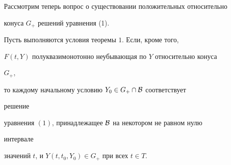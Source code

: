 


Рассмотрим теперь вопрос о существовании положительных относительно 


конуса $G_+$ решений уравнения (1). 


 


\begin{thm} 


Пусть выполняются условия теоремы $1$. Если, кроме того, 


$F(t,Y)$ полуквазимонотонно неубывающая по $Y$ относительно конуса 


$G_+$, 


то каждому начальному условию $Y_0\in G_+\cap\cal B$ соответствует 


решение 


уравнения $(1)$, принадлежащее $\cal B$ на некотором не равном нулю 


интервале 


значений $t$, и $Y(t,t_0,Y_0)\in G_+$ при всех $t\in T$. 


\end{thm} 


 


